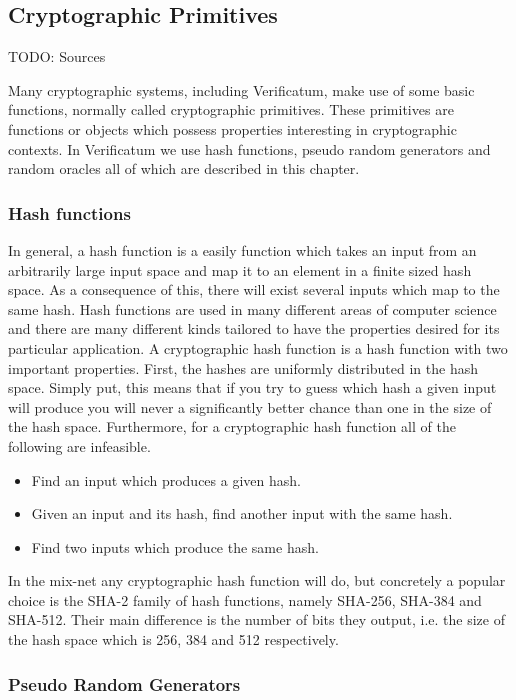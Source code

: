\subsection{Cryptographic Primitives}

TODO: Sources

Many cryptographic systems, including Verificatum, make use of some basic functions, normally called cryptographic primitives. These primitives are functions or objects which possess properties interesting in cryptographic contexts. In Verificatum we use hash functions, pseudo random generators and random oracles all of which are described in this chapter.

\subsubsection{Hash functions}
In general, a hash function is a easily function which takes an input from an arbitrarily large input space and map it to an element in a finite sized hash space. As a consequence of this, there will exist several inputs which map to the same hash. Hash functions are used in many different areas of computer science and there are many different kinds tailored to have the properties desired for its particular application. A cryptographic hash function is a hash function with two important properties. First, the hashes are uniformly distributed in the hash space. Simply put, this means that if you try to guess which hash a given input will produce you will never a significantly better chance than one in the size of the hash space. Furthermore, for a cryptographic hash function all of the following are infeasible.

\begin{itemize}
\item Find an input which produces a given hash.
\item Given an input and its hash, find another input with the same hash.
\item Find two inputs which produce the same hash.
\end{itemize}

In the mix-net any cryptographic hash function will do, but concretely a popular choice is the SHA-2 family of hash functions, namely SHA-256, SHA-384 and SHA-512. Their main difference is the number of bits they output, i.e. the size of the hash space which is 256, 384 and 512 respectively.

\subsubsection{Pseudo Random Generators}

